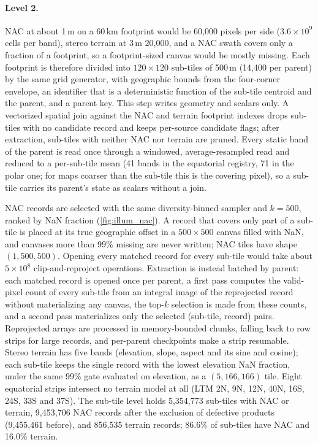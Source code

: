 \paragraph{Level 2.} NAC at about 1\,m on a 60\,km footprint would be 60,000 pixels per side ($3.6\times10^9$ cells per band), stereo terrain at 3\,m 20,000, and a NAC swath covers only a fraction of a footprint, so a footprint-sized canvas would be mostly missing. Each footprint is therefore divided into $120\times120$ sub-tiles of 500\,m (14,400 per parent) by the same grid generator, with geographic bounds from the four-corner envelope, an identifier that is a deterministic function of the sub-tile centroid and the parent, and a parent key. This step writes geometry and scalars only. A vectorized spatial join against the NAC and terrain footprint indexes drops sub-tiles with no candidate record and keeps per-source candidate flags; after extraction, sub-tiles with neither NAC nor terrain are pruned. Every static band of the parent is read once through a windowed, average-resampled read and reduced to a per-sub-tile mean (41 bands in the equatorial registry, 71 in the polar one; for maps coarser than the sub-tile this is the covering pixel), so a sub-tile carries its parent's state as scalars without a join.

NAC records are selected with the same diversity-binned sampler and $k{=}500$, ranked by NaN fraction (\cref{fig:illum_nac}). A record that covers only part of a sub-tile is placed at its true geographic offset in a $500\times500$ canvas filled with NaN, and canvases more than 99\% missing are never written; NAC tiles have shape $(1, 500, 500)$. Opening every matched record for every sub-tile would take about $5\times10^8$ clip-and-reproject operations. Extraction is instead batched by parent: each matched record is opened once per parent, a first pass computes the valid-pixel count of every sub-tile from an integral image of the reprojected record without materializing any canvas, the top-$k$ selection is made from these counts, and a second pass materializes only the selected (sub-tile, record) pairs. Reprojected arrays are processed in memory-bounded chunks, falling back to row strips for large records, and per-parent checkpoints make a strip resumable. Stereo terrain has five bands (elevation, slope, aspect and its sine and cosine); each sub-tile keeps the single record with the lowest elevation NaN fraction, under the same 99\% gate evaluated on elevation, as a $(5, 166, 166)$ tile. Eight equatorial strips intersect no terrain model at all (LTM 2N, 9N, 12N, 40N, 16S, 24S, 33S and 37S). The sub-tile level holds 5,354,773 sub-tiles with NAC or terrain, 9,453,706 NAC records after the exclusion of defective products (9,455,461 before), and 856,535 terrain records; 86.6\% of sub-tiles have NAC and 16.0\% terrain.

